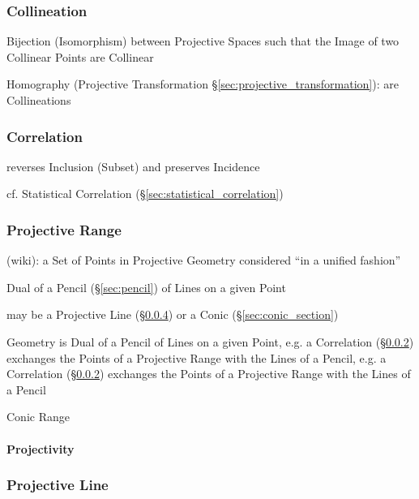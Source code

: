 \subsubsection{Collineation}\label{sec:collineation}

Bijection (Isomorphism) between Projective Spaces such that the Image of two
Collinear Points are Collinear

\fist Homography (Projective Transformation
\S\ref{sec:projective_transformation}): are Collineations %



\subsubsection{Correlation}\label{sec:correlation}

reverses Inclusion (Subset) and preserves Incidence

\fist cf. Statistical Correlation (\S\ref{sec:statistical_correlation})



\subsubsection{Projective Range}\label{sec:projective_range}

(wiki): a Set of Points in Projective Geometry considered ``in a unified
fashion''

Dual of a Pencil (\S\ref{sec:pencil}) of Lines on a given Point

may be a Projective Line (\S\ref{sec:projective_line}) or a Conic
(\S\ref{sec:conic_section})

Geometry is Dual of a Pencil of Lines on a given Point, e.g. a Correlation
(\S\ref{sec:correlation}) exchanges the Points of a Projective Range with the
Lines of a Pencil, e.g. a Correlation (\S\ref{sec:correlation}) exchanges the
Points of a Projective Range with the Lines of a Pencil

Conic Range



\paragraph{Projectivity}\label{sec:projectivity}\hfill



\subsubsection{Projective Line}\label{sec:projective_line}

